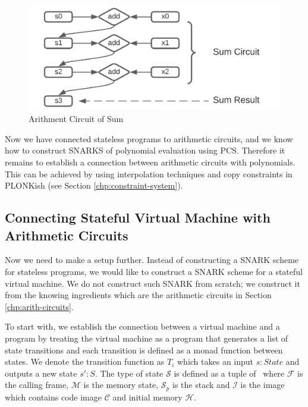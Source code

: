\begin{figure}[!ht]
\centerline{
\includegraphics[scale=0.8]{figs/arithment-circuit.png}
}
\caption{Arithment Circuit of Sum}\label{fig:sum-gates}
\end{figure}

Now we have connected stateless programs to arithmetic circuits, and we know how to construct SNARKS of polynomial evaluation using PCS. Therefore it remains to establish a connection between arithmetic circuits with polynomials. This can be achieved by using interpolation techniques and copy constraints in PLONKish (see Section \ref{chp:constraint-system}).

\subsection{Connecting Stateful Virtual Machine with Arithmetic Circuits}
\label{chp:encode-state-in-circuits}
Now we need to make a setup further. Instead of constructing a SNARK scheme for stateless programs, we would like to construct a SNARK scheme for a stateful virtual machine. We do not construct such SNARK from scratch; we construct it from the knowing ingredients which are the arithmetic circuits in Section \ref{chp:arith-circuits}. 

To start with, we establish the connection between a virtual machine and a program by treating the virtual machine as a program that generates a list of state transitions and each transition is defined as a monad function between states. We denote the transition function as $T_i$ which takes an input $s:State$ and outputs a new state $s':S$. The type of state $\mathcal{S}$ is defined as a tuple of \fullstate \, where $\mathcal{F}$ is the calling frame, $\mathcal{M}$ is the memory state, $\mathcal{S}_p$ is the stack and $\mathcal{I}$ is the image which contains code image $\mathcal{C}$ and initial memory $\mathcal{H}$.

